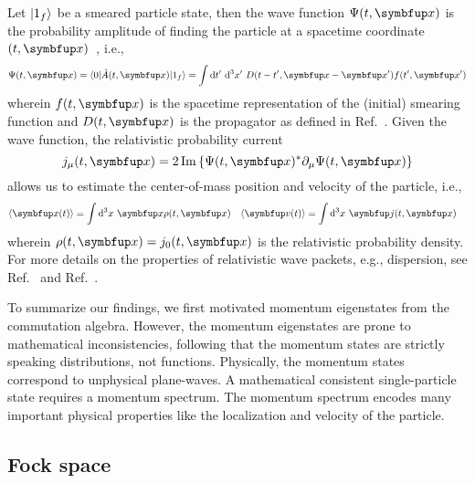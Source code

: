 Let $\lvert1_f\rangle$ be a smeared particle state, then the wave function $\Psi(t,\vb{x})$ is the probability amplitude of finding the particle at a spacetime coordinate $(t,\vb{x})$~\cite[p.~24]{Peskin1995}, i.e.,
\begin{equation}
	\Psi(t,\vb{x})
	=
	\bra{0}
	\hat{A}(t,\vb{x})
	\ket{1_f}
	=
	\int\dd{t^\prime}\dd[3]{x^\prime}
	D(t-t^\prime,\vb{x}-\vb{x}^\prime)
	f(t^\prime,\vb{x}^\prime)
\end{equation}
wherein $f(t,\vb{x})$ is the spacetime representation of the (initial) smearing function and $D(t,\vb{x})$ is the propagator as defined in Ref.~\cite[p.~27]{Peskin1995}.
Given the wave function, the relativistic probability current
\begin{equation}
	j_\mu(t,\vb{x})
	=
	2\Im\left\{
		\Psi(t,\vb{x})^*
		\partial_\mu
		\Psi(t,\vb{x})
	\right\}
\end{equation}
allows us to estimate the center-of-mass position and velocity of the particle, i.e.,
\begin{align}
	\expval{\vb{x}(t)}
	&=
	\int\dd[3]{x}
	\vb{x}
	\rho(t,\vb{x})
	&
	\expval{\vb{v}(t)}
	&=
	\int\dd[3]{x}
	\vb{j}(t,\vb{x})
\end{align}
wherein $\rho(t,\vb{x})=j_0(t,\vb{x})$ is the relativistic probability density.
For more details on the properties of relativistic wave packets, e.g., dispersion, see Ref.~\cite{Naumov2013} and Ref.~\cite{Naumov2009}.

To summarize our findings, we first motivated momentum eigenstates from the commutation algebra.
However, the momentum eigenstates are prone to mathematical inconsistencies, following that the momentum states are strictly speaking distributions, not functions.
Physically, the momentum states correspond to unphysical plane-waves.
A mathematical consistent single-particle state requires a momentum spectrum.
The momentum spectrum encodes many important physical properties like the localization and velocity of the particle.

\subsection{Fock space}

